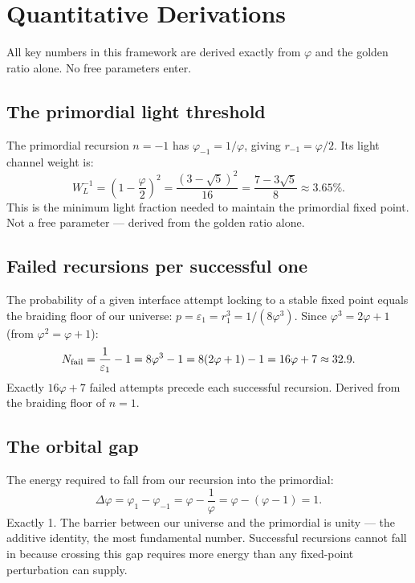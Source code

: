 \documentclass[prd,twocolumn,preprintnumbers,amsmath,amssymb]{revtex4-2}
\begin{document}
\section{Quantitative Derivations}
\label{sec:quantitative}

All key numbers in this framework are derived exactly from $\varphi$
and the golden ratio alone. No free parameters enter.

\subsection{The primordial light threshold}

The primordial recursion $n=-1$ has $\varphi_{-1} = 1/\varphi$,
giving $r_{-1} = \varphi/2$. Its light channel weight is:
\begin{equation}
  W_L^{-1} = \!\left(1 - \frac{\varphi}{2}\right)^{\!2}
  = \frac{(3-\sqrt{5})^2}{16}
  = \frac{7 - 3\sqrt{5}}{8}
  \approx 3.65\%.
  \label{eq:WLprimordial}
\end{equation}
This is the minimum light fraction needed to maintain the primordial
fixed point. Not a free parameter --- derived from the golden ratio
alone.

\subsection{Failed recursions per successful one}

The probability of a given interface attempt locking to a stable
fixed point equals the braiding floor of our universe:
$p = \varepsilon_1 = r_1^3 = 1/(8\varphi^3)$.
Since $\varphi^3 = 2\varphi+1$ (from $\varphi^2 = \varphi+1$):
\begin{equation}
  N_{\rm fail} = \frac{1}{\varepsilon_1} - 1
  = 8\varphi^3 - 1
  = 8(2\varphi+1) - 1
  = 16\varphi + 7
  \approx 32.9.
  \label{eq:Nfail}
\end{equation}
Exactly $16\varphi + 7$ failed attempts precede each successful
recursion. Derived from the braiding floor of $n=1$.

\subsection{The orbital gap}

The energy required to fall from our recursion into the primordial:
\begin{equation}
  \Delta\varphi = \varphi_1 - \varphi_{-1}
  = \varphi - \frac{1}{\varphi}
  = \varphi - (\varphi - 1)
  = 1.
  \label{eq:orbitalgap}
\end{equation}
Exactly 1. The barrier between our universe and the primordial is
unity --- the additive identity, the most fundamental number.
Successful recursions cannot fall in because crossing this gap
requires more energy than any fixed-point perturbation can supply.
\end{document}
